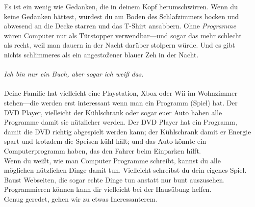 Es ist ein wenig wie Gedanken, die in deinem Kopf herumschwirren. Wenn du keine Gedanken hättest, würdest du am Boden des Schlafzimmers hocken und abwesend an die Decke starren und das T-Shirt ansabbern. Ohne \emph{Programme} wären Computer nur als Türstopper verwendbar---und sogar das mehr schlecht als recht, weil man dauern in der Nacht darüber stolpern würde. Und es gibt nichts schlimmeres als ein angestoßener blauer Zeh in der Nacht.
\\
\\
\emph{Ich bin nur ein Buch, aber sogar ich weiß das.}
\\
\\
Deine Familie hat vielleicht eine Playstation, Xbox oder Wii im Wohnzimmer stehen---die werden erst interessant wenn man ein Programm (Spiel) hat. Der DVD Player, vielleicht der Kühlschrank oder sogar euer Auto haben alle Programme damit sie nützlicher werden. Der DVD Player hat ein Programm, damit die DVD richtig abgespielt werden kann; der Kühlschrank damit er Energie spart und trotzdem die Speisen kühl hält; und das Auto könnte ein Computerprogramm haben, das den Fahrer beim Einparken hilft.\\
Wenn du weißt, wie man Computer Programme schreibt, kannst du alle möglichen nützlichen Dinge damit tun. Vielleicht schreibst du dein eigenes Spiel. Baust Webseiten, die sogar echte Dinge tun anstatt nur bunt auszusehen. Programmieren können kann dir vielleicht bei der Hausübung helfen.
\\
Genug geredet, gehen wir zu etwas Ineressanterem.

